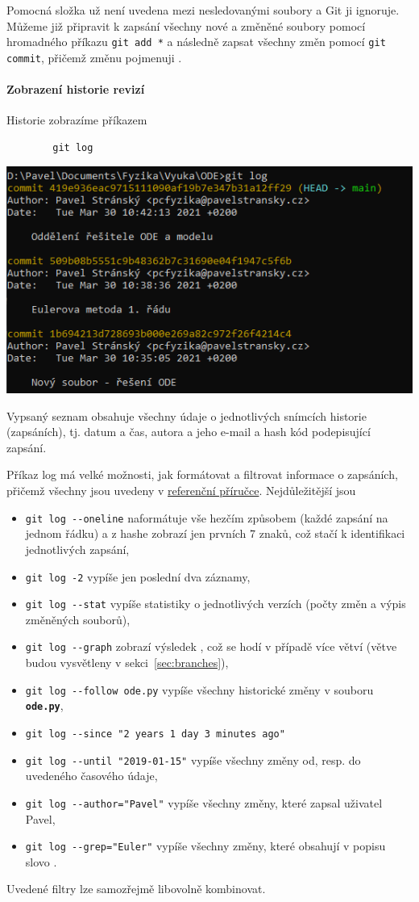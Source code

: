 \documentclass[a4paper,11pt,twoside]{article}
\newcommand{\subsubsubsection}[1]{\paragraph{#1}\mbox{}

}
\def\code#1{\textnormal{\texttt{#1}}}
\def\file#1{\textnormal{\textbf{\texttt{#1}}}}
\theoremstyle{red}
\theoremstyle{green}
\begin{document}
    Pomocná složka už není uvedena mezi nesledovanými soubory a Git ji ignoruje.
    Můžeme již připravit k zapsání všechny nové a změněné soubory pomocí hromadného příkazu \code{git add *} a následně zapsat všechny změn pomocí \code{git commit},
    přičemž změnu pojmenuji .

\subsubsubsection{Zobrazení historie revizí}
\label{sec:gitlog}
    Historie zobrazíme příkazem
    \begin{lstlisting}
        git log\end{lstlisting}
    \begin{center}\includegraphics[width=0.7\linewidth]{GitLog.png}\end{center}
    Vypsaný seznam obsahuje všechny údaje o jednotlivých snímcích historie (zapsáních), tj. datum a čas, autora a jeho e-mail a hash kód podepisující zapsání.

    Příkaz log má velké možnosti, jak formátovat a filtrovat informace o zapsáních, přičemž všechny jsou uvedeny v \href{https://git-scm.com/docs/git-log}{referenční příručce}.
    Nejdůležitější jsou
    \begin{itemize}
        \item \code{git log -{}-oneline} naformátuje vše hezčím způsobem (každé zapsání na jednom řádku) a z hashe zobrazí jen prvních 7 znaků, což stačí k identifikaci jednotlivých zapsání,
        \item \code{git log -2} vypíše jen poslední dva záznamy,
        \item \code{git log -{}-stat} vypíše statistiky o jednotlivých verzích (počty změn a výpis změněných souborů),
        \item \code{git log -{}-graph} zobrazí výsledek , což se hodí v případě více větví (větve budou vysvětleny v sekci~\ref{sec:branches}),
        \item \code{git log -{}-follow ode.py} vypíše všechny historické změny v souboru \file{ode.py},
        \item \code{git log -{}-since "2 years 1 day 3 minutes ago"} 
        \item \code{git log -{}-until "2019-01-15"} vypíše všechny změny od, resp. do uvedeného časového údaje,
        \item \code{git log -{}-author="Pavel"} vypíše všechny změny, které zapsal uživatel Pavel,
        \item \code{git log -{}-grep="Euler"} vypíše všechny změny, které obsahují v popisu slovo .
    \end{itemize}
    Uvedené filtry lze samozřejmě libovolně kombinovat.
\end{document}
